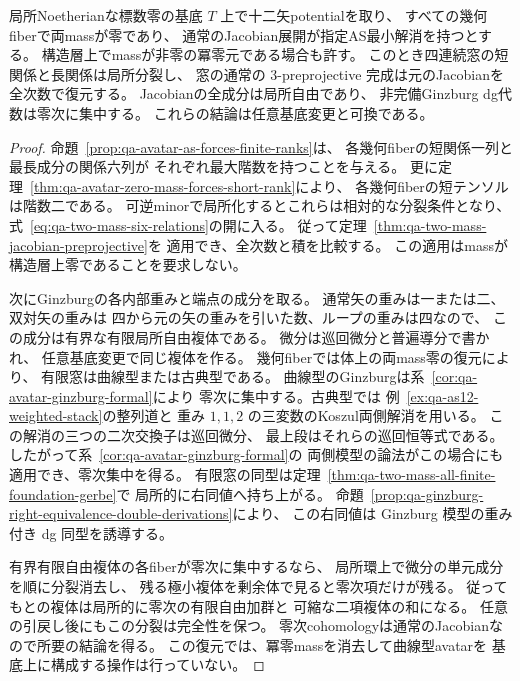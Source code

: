 \begin{theorem}[幾何fiberで両mass零となる相対族の全次数復元]
\label{thm:qa-avatar-nilpotent-mass-reverse}
局所Noetherianな標数零の基底 $T$ 上で十二矢potentialを取り、
すべての幾何fiberで両massが零であり、
通常のJacobian展開が指定AS最小解消を持つとする。
構造層上でmassが非零の冪零元である場合も許す。
このとき四連続窓の短関係と長関係は局所分裂し、
窓の通常の $3$-preprojective 完成は元のJacobianを全次数で復元する。
Jacobianの全成分は局所自由であり、
非完備Ginzburg dg代数は零次に集中する。
これらの結論は任意基底変更と可換である。
\end{theorem}
\begin{proof}
命題~\ref{prop:qa-avatar-as-forces-finite-ranks}は、
各幾何fiberの短関係一列と最長成分の関係六列が
それぞれ最大階数を持つことを与える。
更に定理~\ref{thm:qa-avatar-zero-mass-forces-short-rank}により、
各幾何fiberの短テンソルは階数二である。
可逆minorで局所化するとこれらは相対的な分裂条件となり、
式~\eqref{eq:qa-two-mass-six-relations}の開に入る。
従って定理~\ref{thm:qa-two-mass-jacobian-preprojective}を
適用でき、全次数と積を比較する。
この適用はmassが構造層上零であることを要求しない。

次にGinzburgの各内部重みと端点の成分を取る。
通常矢の重みは一または二、双対矢の重みは
四から元の矢の重みを引いた数、ループの重みは四なので、
この成分は有界な有限局所自由複体である。
微分は巡回微分と普遍導分で書かれ、
任意基底変更で同じ複体を作る。
幾何fiberでは体上の両mass零の復元により、
有限窓は曲線型または古典型である。
曲線型のGinzburgは系~\ref{cor:qa-avatar-ginzburg-formal}により
零次に集中する。古典型では
例~\ref{ex:qa-as12-weighted-stack}の整列道と
重み $1,1,2$ の三変数のKoszul両側解消を用いる。
この解消の三つの二次交換子は巡回微分、
最上段はそれらの巡回恒等式である。
したがって系~\ref{cor:qa-avatar-ginzburg-formal}の
両側模型の論法がこの場合にも適用でき、零次集中を得る。
有限窓の同型は定理~\ref{thm:qa-two-mass-all-finite-foundation-gerbe}で
局所的に右同値へ持ち上がる。
命題~\ref{prop:qa-ginzburg-right-equivalence-double-derivations}により、
この右同値は Ginzburg 模型の重み付き dg 同型を誘導する。

有界有限自由複体の各fiberが零次に集中するなら、
局所環上で微分の単元成分を順に分裂消去し、
残る極小複体を剰余体で見ると零次項だけが残る。
従ってもとの複体は局所的に零次の有限自由加群と
可縮な二項複体の和になる。
任意の引戻し後にもこの分裂は完全性を保つ。
零次cohomologyは通常のJacobianなので所要の結論を得る。
この復元では、冪零massを消去して曲線型avatarを
基底上に構成する操作は行っていない。
\end{proof}

